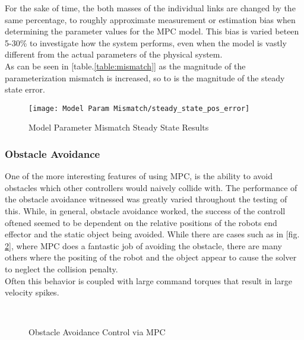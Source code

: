\documentclass[journal]{IEEEtran}
\begin{document}
For the sake of time, the both masses of the individual links are changed by the same percentage, to roughly approximate measurement or estimation bias when determining the parameter values for the MPC model. This bias is varied beteen 5-30\% to investigate how the system performs, even when the model is vastly different from the actual parameters of the physical system. \\

As can be seen in [table.\ref{table:mismatch}] as the magnitude of the parameterization mismatch is increased, so to is the magnitude of the steady state error.

\begin{figure}[ht]%
    \centering
    \texttt{[image: Model Param Mismatch/steady\_state\_pos\_error]}
    \caption{Model Parameter Mismatch Steady State Results}%
    \label{fig:model_param_mismatch}%
\end{figure}

\subsubsection{Obstacle Avoidance}

One of the more interesting features of using MPC, is the ability to avoid obstacles which other controllers would naively collide with. The performance of the obstacle avoidance witnessed was greatly varied throughout the testing of this. While, in general, obstacle avoidance worked, the success of the controll oftened seemed to be dependent on the relative positions of the robots end effector and the static object being avoided. While there are cases such as in [fig. \ref{fig:obs_avoid_control_action}], where MPC does a fantastic job of avoiding the obstacle, there are many others where the positing of the robot and the object appear to cause the solver to neglect the collision penalty. \\

Often this behavior is coupled with large command torques that result in large velocity spikes.

\begin{figure}[ht]%
    \centering
    \qquad
    \\
    \caption{Obstacle Avoidance Control via MPC}%
    \label{fig:obs_avoid_control_action}%
\end{figure}
\end{document}
